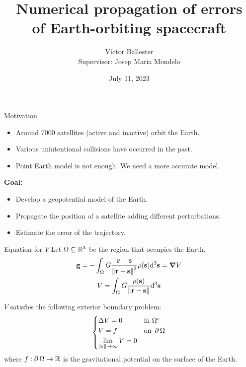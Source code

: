 \documentclass{beamer} %
\title{Numerical propagation of errors\\of Earth-orbiting spacecraft}
\author{Víctor Ballester\texorpdfstring{\vspace{0.15cm}\\}{}{\small Supervisor: Josep Maria Mondelo}}
\institute{Departament de Matemàtiques\\Facultat de Ciències}
\date{July 11, 2023}
\begin{document}
\frame{\titlepage}
\begin{frame}{Motivation}
  \begin{itemize}
    \item Around 7000 satellites (active and inactive) orbit the Earth.
    \item Various unintentional collisions have occurred in the past.
    \item Point Earth model is not enough. We need a more accurate model.
  \end{itemize}
  \vspace{0.5cm}\pause
  \textbf{Goal:}
  \begin{itemize}
    \item Develop a geopotential model of the Earth.
    \item Propagate the position of a satellite adding different perturbations.
    \item Estimate the error of the trajectory.
  \end{itemize}
\end{frame}
\begin{frame}{Equation for $V$}
  Let $\Omega\subseteq \mathbb{R}^3$ be the region that occupies the Earth.
  \begin{gather*}
    \boldsymbol{\mathrm{g}} = -\int_\Omega G\frac{\boldsymbol{\mathrm{r}}-\boldsymbol{\mathrm{s}}}{\left\|\boldsymbol{\mathrm{r}}-\boldsymbol{\mathrm{s}}\right\|^3}\rho(\boldsymbol{\mathrm{s}})\dd^3\boldsymbol{\mathrm{s}}=\grad V\\
    V=\int_\Omega G\frac{\rho(\boldsymbol{\mathrm{s}})}{\left\|\boldsymbol{\mathrm{r}}-\boldsymbol{\mathrm{s}}\right\|}\dd^3\boldsymbol{\mathrm{s}}
  \end{gather*}\pause
  \begin{theorem}
    $V$ satisfies the following exterior boundary problem:
    \begin{equation*}\label{eq:dirichletProblem}
      \begin{cases}
        \Delta V = 0 & \text{in } \Omega^c    \\
        V = f            & \text{on } \operatorname{\partial}{\Omega} \\
        \displaystyle\lim_{\left\|\boldsymbol{\mathrm{r}}\right\|\to\infty}V=0
      \end{cases}
    \end{equation*}
    where $f:\operatorname{\partial}{\Omega}\to\mathbb{R}$ is the gravitational potential on the surface of the Earth.
  \end{theorem}
\end{frame}
\end{document}

